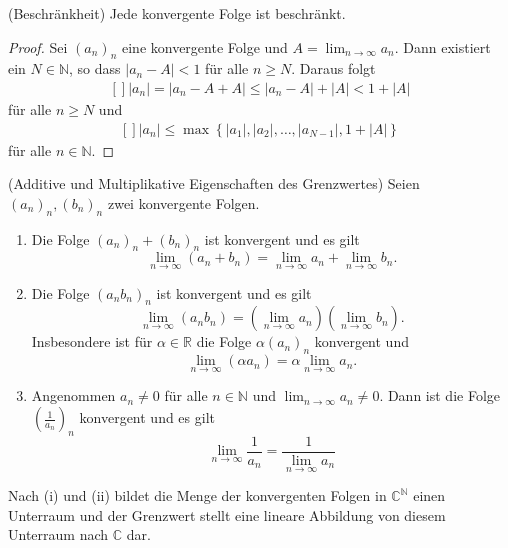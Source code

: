 \documentclass[../Analysis1_script.tex]{subfiles}
\begin{document}
\begin{lemma}{(Beschränkheit)}\label{lemma:beschr}
	Jede konvergente Folge ist beschränkt. 
\end{lemma}

\begin{proof}
	Sei $(a_n)_{n}$ eine konvergente Folge und $A = \lim _{n\to \infty }a_n$. Dann existiert ein $N \in \mathbb {N}$, so dass $|a_n-A|<1$ für alle $n \geq N$. Daraus folgt
	\[\begin{aligned}[]
		|a_n| = |a_n - A+A| \leq |a_n-A|+|A| <1+|A|
	\end{aligned}\]
	für alle $n \geq N$ und
	\[\begin{aligned}[]
		|a_n| \leq \max \left \lbrace {|a_1|,|a_2|,\ldots ,|a_{N-1}|,1+|A|} \right \rbrace
	\end{aligned}\]
	für alle $n \in \mathbb {N}$.
\end{proof}

\begin{proposition}{(Additive und Multiplikative Eigenschaften des Grenzwertes)}\label{folg:add_and_mult}
	Seien $(a_n)_n, (b_n)_n$ zwei konvergente Folgen.
	\begin{enumerate}
		\item Die Folge $(a_n)_n + (b_n)_n$ ist konvergent und es gilt
			\[\lim_{n \to \infty}(a_n + b_n) = \lim_{n \to \infty} a_n + \lim_{n \to \infty} b_n . \]
		\item Die Folge $(a_n b_n)_n$ ist konvergent und es gilt
			\[\lim_{n \to \infty}(a_n b_n) = (\lim_{n \to \infty} a_n)(\lim_{n \to \infty} b_n) . \]
			Insbesondere ist für $\alpha \in \mathbb{R}$ die Folge $\alpha (a_n)_n$ konvergent und 
			\[\lim_{n \to \infty}(\alpha a_n) = \alpha \lim_{n \to \infty} a_n . \]
		\item Angenommen $a_n \neq 0$ für alle $n \in \mathbb{N}$ und $\lim_{n \to \infty} a_n \neq 0$. Dann ist die Folge $(\frac{1}{a_n})_n$ konvergent und es gilt
			\[\lim_{n \to \infty} \frac{1}{a_n} = \frac{1}{\lim_{n \to \infty} a_n}\]
	\end{enumerate}
	Nach (i) und (ii) bildet die Menge der konvergenten Folgen in $\mathbb{C}^\mathbb{N}$ einen Unterraum und der Grenzwert stellt eine lineare Abbildung von diesem Unterraum nach $\mathbb{C}$ dar.
\end{proposition}
 
\end{document}
